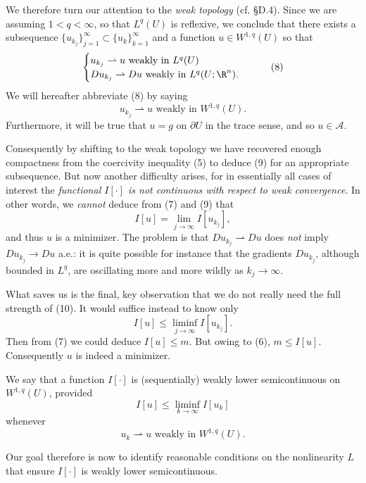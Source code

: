 We therefore turn our attention to the \textit{weak topology} (cf. \S D.4). Since we are assuming $1 < q < \infty$, so that $L^q(U)$ is reflexive, we conclude that there exists a subsequence $\{u_{k_j}\}_{j=1}^{\infty} \subset \{u_k\}_{k=1}^{\infty}$ and a function $u \in W^{1,q}(U)$ so that
\[
\begin{cases}
u_{k_j} \rightharpoonup u \text{ weakly in } L^q(U) \\
Du_{k_j} \rightharpoonup Du \text{ weakly in } L^q(U; \R^n).
\end{cases}
\tag{8}
\]
We will hereafter abbreviate (8) by saying
\[
u_{k_j} \rightharpoonup u \text{ weakly in } W^{1,q}(U).
\tag{9}
\]
Furthermore, it will be true that $u = g$ on $\partial U$ in the trace sense, and so $u \in \mathcal{A}$.

Consequently by shifting to the weak topology we have recovered enough compactness from the coercivity inequality (5) to deduce (9) for an appropriate subsequence. But now another difficulty arises, for in essentially all cases of interest the \textit{functional $I[\cdot]$ is not continuous with respect to weak convergence}. In other words, we \textit{cannot} deduce from (7) and (9) that
\[
I[u] = \lim_{j \to \infty} I[u_{k_j}],
\tag{10}
\]
and thus $u$ is a minimizer. The problem is that $Du_{k_j} \rightharpoonup Du$ does \textit{not} imply $Du_{k_j} \to Du$ a.e.: it is quite possible for instance that the gradients $Du_{k_j}$, although bounded in $L^q$, are oscillating more and more wildly as $k_j \to \infty$.

What saves us is the final, key observation that we do not really need the full strength of (10). It would suffice instead to know only
\[
I[u] \leq \liminf_{j \to \infty} I[u_{k_j}].
\tag{11}
\]
Then from (7) we could deduce $I[u] \leq m$. But owing to (6), $m \leq I[u]$. Consequently $u$ is indeed a minimizer.

\begin{definition}
\label{def:weakly-lower-semicontinuous-functional}
We say that a function $I[\cdot]$ is (sequentially) weakly lower semicontinuous on $W^{1,q}(U)$, provided
\[
I[u] \leq \liminf_{k \to \infty} I[u_k]
\]
whenever
\[
u_k \rightharpoonup u \text{ weakly in } W^{1,q}(U).
\]
\end{definition}

Our goal therefore is now to identify reasonable conditions on the nonlinearity $L$ that ensure $I[\cdot]$ is weakly lower semicontinuous.

